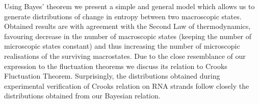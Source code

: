 \documentclass[a0]{sciposter}
\begin{document}






Using Bayes' theorem we present a simple and general model which allows us to generate distributions of change in entropy between two macroscopic states. Obtained results are with agreement with the Second Law of thermodynamics, favouring decrease in the number of macroscopic states (keeping the number of microscopic states constant) and thus increasing the number of microscopic realisations of the surviving macrostates.
Due to the close resemblance of our expression to the fluctuation theorems we discuss its relation to Crooks Fluctuation Theorem. Surprisingly, the distributions obtained during experimental verification of Crooks relation on RNA strands follow closely the distributions obtained from our Bayesian relation.
\end{document}
